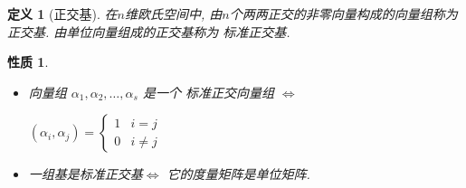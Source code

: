 \documentclass[13pt]{beamer}
\newtheorem*{defi}{定义}
\newtheorem*{prop}{性质}
\begin{document}
\begin{frame}
\begin{defi}[正交基]
	在$n$维欧氏空间中, 由$n$个两两正交的非零向量构成的向量组称为 \alert{正交基}. 
	由单位向量组成的正交基称为 \alert{标准正交基}.
	
\end{defi}


\begin{prop}
	\begin{itemize}
		\item 向量组 $\alpha_{1}, \alpha_{2}, \ldots, \alpha_{s}$ 是一个
		标准正交向量组
		$\Longleftrightarrow$ 
		\begin{center}
		$\left(\alpha_{i}, \alpha_{j}\right)=
		\left\{\begin{array}{ll} 
		{1} & {i}={j} \\ 
		{0} & {i} \neq {j}
		\end{array}\right.$
		\end{center}

		\item 	一组基是标准正交基$\Longleftrightarrow$ 它的度量矩阵是单位矩阵. 
	\end{itemize}
\end{prop}

\end{frame}
\end{document}
